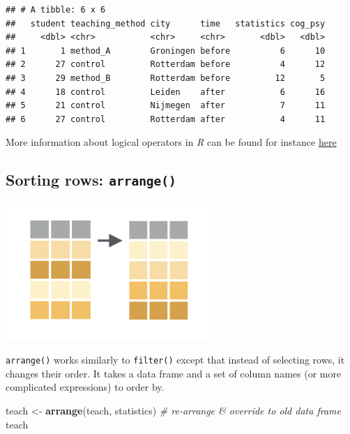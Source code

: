 \documentclass[
]{scrartcl}
\newenvironment{Shaded}{\begin{snugshade}}{\end{snugshade}}
\newcommand{\CommentTok}[1]{\textcolor[rgb]{0.56,0.35,0.01}{\textit{#1}}}
\newcommand{\FunctionTok}[1]{\textcolor[rgb]{0.13,0.29,0.53}{\textbf{#1}}}
\newcommand{\NormalTok}[1]{#1}
\newcommand{\OtherTok}[1]{\textcolor[rgb]{0.56,0.35,0.01}{#1}}
\begin{document}
\begin{verbatim}
## # A tibble: 6 x 6
##   student teaching_method city      time   statistics cog_psy
##     <dbl> <chr>           <chr>     <chr>       <dbl>   <dbl>
## 1       1 method_A        Groningen before          6      10
## 2      27 control         Rotterdam before          4      12
## 3      29 method_B        Rotterdam before         12       5
## 4      18 control         Leiden    after           6      16
## 5      21 control         Nijmegen  after           7      11
## 6      27 control         Rotterdam after           4      11
\end{verbatim}

More information about logical operators in \emph{R} can be found for instance \href{https://r4ds.had.co.nz/transform.html\#logical-operators}{here}

\hypertarget{sorting-rows-arrange}{%
\subsection{\texorpdfstring{Sorting rows: \texttt{arrange()}}{Sorting rows: arrange()}}\label{sorting-rows-arrange}}

\begin{center}\includegraphics[width=300px]{images/dplyr-arrange} \end{center}

\texttt{arrange()} works similarly to \texttt{filter()} except that instead of selecting rows, it changes their order. It takes a data frame and a set of column names (or more complicated expressions) to order by.

\begin{Shaded}
\begin{Highlighting}[]
\NormalTok{teach }\OtherTok{\textless{}{-}} \FunctionTok{arrange}\NormalTok{(teach, statistics)   }\CommentTok{\# re{-}arrange \& override to old data frame}
\NormalTok{teach}
\end{Highlighting}
\end{Shaded}
\end{document}
